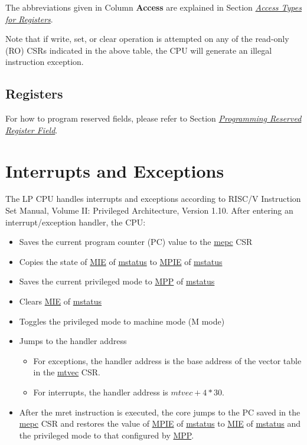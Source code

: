 \documentclass[main\_\_EN.tex]{subfiles}
\begin{document}
The abbreviations given in Column \textbf{Access} are explained in Section \hyperref[glossary-access-types]{\textit{Access Types for Registers}}.



Note that if write, set, or clear operation is attempted on any of the read-only (RO) CSRs indicated in the above table, the CPU will generate an illegal instruction exception.

\subsection{Registers}

For how to program reserved fields, please refer to Section \hyperref[programming-reserved-field]{\textit{Programming Reserved Register Field}}.




\section{Interrupts and Exceptions}

The LP CPU handles interrupts and exceptions according to RISC\-/V Instruction Set Manual, Volume II: Privileged Architecture, Version 1.10. After entering an interrupt/exception handler, the CPU:
\begin{itemize}
    \item Saves the current program counter (PC) value to the \hyperref[regdesc:LPMEPC]{mepc} CSR
    \item Copies the state of \hyperref[fielddesc:LPMSTATUSMIE]{MIE} of \hyperref[regdesc:LPMSTATUS]{mstatus} to \hyperref[fielddesc:LPMSTATUSMPIE]{MPIE} of \hyperref[regdesc:LPMSTATUS]{mstatus}
    \item Saves the current privileged mode to \hyperref[fielddesc:LPMSTATUSMPP]{MPP} of \hyperref[regdesc:LPMSTATUS]{mstatus}
    \item Clears \hyperref[fielddesc:LPMSTATUSMIE]{MIE} of \hyperref[regdesc:LPMSTATUS]{mstatus}
    \item Toggles the privileged mode to machine mode (M mode)
    \item Jumps to the handler address
        \begin{itemize}
            \item For exceptions, the handler address is the base address of the vector table in the \hyperref[regdesc:LPMTVEC]{mtvec} CSR.
            \item For interrupts, the handler address is $mtvec + 4*30$.
        \end{itemize}
    \item After the mret instruction is executed, the core jumps to the PC saved in the \hyperref[regdesc:LPMEPC]{mepc} CSR and restores the value of \hyperref[fielddesc:LPMSTATUSMPIE]{MPIE} of \hyperref[regdesc:LPMSTATUS]{mstatus} to \hyperref[fielddesc:LPMSTATUSMIE]{MIE} of \hyperref[regdesc:LPMSTATUS]{mstatus} and the privileged mode to that configured by \hyperref[fielddesc:LPMSTATUSMPP]{MPP}.
\end{itemize}
\end{document}
